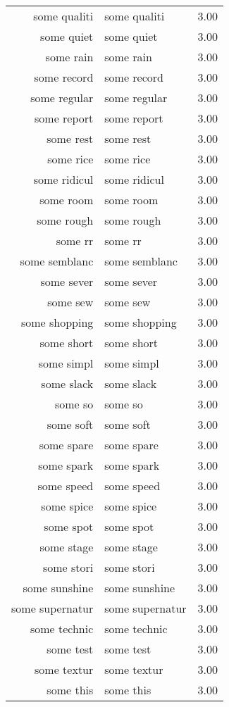 \begin{table}[ht]
\begin{tabular}{rlr}
  some qualiti & some qualiti & 3.00 \\ 
  some quiet & some quiet & 3.00 \\ 
  some rain & some rain & 3.00 \\ 
  some record & some record & 3.00 \\ 
  some regular & some regular & 3.00 \\ 
  some report & some report & 3.00 \\ 
  some rest & some rest & 3.00 \\ 
  some rice & some rice & 3.00 \\ 
  some ridicul & some ridicul & 3.00 \\ 
  some room & some room & 3.00 \\ 
  some rough & some rough & 3.00 \\ 
  some rr & some rr & 3.00 \\ 
  some semblanc & some semblanc & 3.00 \\ 
  some sever & some sever & 3.00 \\ 
  some sew & some sew & 3.00 \\ 
  some shopping & some shopping & 3.00 \\ 
  some short & some short & 3.00 \\ 
  some simpl & some simpl & 3.00 \\ 
  some slack & some slack & 3.00 \\ 
  some so & some so & 3.00 \\ 
  some soft & some soft & 3.00 \\ 
  some spare & some spare & 3.00 \\ 
  some spark & some spark & 3.00 \\ 
  some speed & some speed & 3.00 \\ 
  some spice & some spice & 3.00 \\ 
  some spot & some spot & 3.00 \\ 
  some stage & some stage & 3.00 \\ 
  some stori & some stori & 3.00 \\ 
  some sunshine & some sunshine & 3.00 \\ 
  some supernatur & some supernatur & 3.00 \\ 
  some technic & some technic & 3.00 \\ 
  some test & some test & 3.00 \\ 
  some textur & some textur & 3.00 \\ 
  some this & some this & 3.00 \\ 

\end{tabular}
\end{table}
